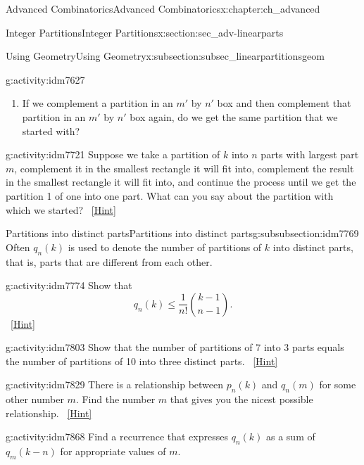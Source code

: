 \documentclass[oneside,10pt,]{book}
\numberwithin{equation}{chapter}
\begin{document}
\begin{chapterptx}{Advanced Combinatorics}{}{Advanced Combinatorics}{}{}{x:chapter:ch_advanced}
\begin{sectionptx}{Integer Partitions}{}{Integer Partitions}{}{}{x:section:sec_adv-linearparts}
\begin{subsectionptx}{Using Geometry}{}{Using Geometry}{}{}{x:subsection:subsec_linearpartitionsgeom}
\begin{introduction}{}
\begin{activity}{}{g:activity:idm7627}
\begin{enumerate}[font=\bfseries,label=(\alph*),ref=\alph*]
\item{}If we complement a partition in an \(m'\) by \(n'\) box and then complement that partition in an \(m'\) by \(n'\) box again, do we get the same partition that we started with?%
\end{enumerate}
\end{activity}
\begin{activity}{}{g:activity:idm7721}%
Suppose we take a partition of \(k\) into \(n\) parts with largest part \(m\), complement it in the smallest rectangle it will fit into, complement the result in the smallest rectangle it will fit into, and continue the process until we get the partition 1 of one into one part.  What can you say about the partition with which we started?%
\qquad~\hfill{\tiny\hyperlink{g:hint:idm7727-back}{[Hint]}}\end{activity}
\end{introduction}%
%
%
\typeout{************************************************}
\typeout{************************************************}
%
\begin{subsubsectionptx}{Partitions into distinct parts}{}{Partitions into distinct parts}{}{}{g:subsubsection:idm7769}
Often \(q_n(k)\) is used to denote the number of partitions of \(k\) into distinct parts, that is, parts that are different from each other.%
\begin{activity}{}{g:activity:idm7774}%
Show that%
\begin{equation*}
q_n(k) \le \frac{1}{n!}\binom{k-1}{n-1}.
\end{equation*}
%
\qquad~\hfill{\tiny\hyperlink{g:hint:idm7778-back}{[Hint]}}\end{activity}
\begin{activity}{}{g:activity:idm7803}%
Show that the number of partitions of 7 into 3 parts equals the number of partitions of 10 into three distinct parts.%
\qquad~\hfill{\tiny\hyperlink{g:hint:idm7806-back}{[Hint]}}\end{activity}
\begin{activity}{}{g:activity:idm7829}%
There is a relationship between \(p_n(k)\) and \(q_n(m)\) for some other number \(m\). Find the number \(m\) that gives you the nicest possible relationship.%
\qquad~\hfill{\tiny\hyperlink{g:hint:idm7836-back}{[Hint]}}\end{activity}
\begin{activity}{}{g:activity:idm7868}%
Find a recurrence that expresses \(q_n(k)\) as a sum of \(q_m(k-n)\) for appropriate values of \(m\).%

\end{activity}
\end{subsubsectionptx}
\end{subsectionptx}
\end{sectionptx}
\end{chapterptx}
\end{document}
